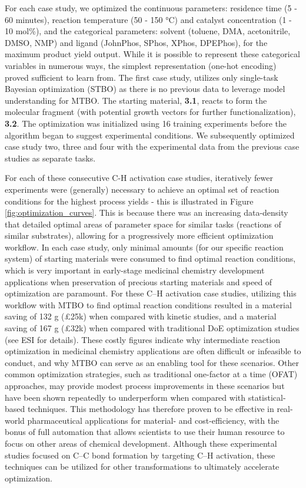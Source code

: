 For each case study, we optimized the continuous parameters: residence time (5 - 60 minutes), reaction temperature (50 - 150 °C) and catalyst concentration (1 - 10 mol\%), and the categorical parameters: solvent (toluene, DMA, acetonitrile, DMSO, NMP) and ligand (JohnPhos, SPhos, XPhos, DPEPhos), for the maximum product yield output. While it is possible to represent these categorical variables in numerous ways, the simplest representation (one-hot encoding) proved sufficient to learn from. The first case study, utilizes only single-task Bayesian optimization (STBO) as there is no previous data to leverage model understanding for MTBO. The starting material, \textbf{3.1}, reacts to form the molecular fragment (with potential growth vectors for further functionalization), \textbf{3.2}. The optimization was initialized using 16 training experiments before the algorithm began to suggest experimental conditions. We subsequently optimized case study two, three and four with the experimental data from the previous case studies as separate tasks.

For each of these consecutive C-H activation case studies, iteratively fewer experiments were (generally) necessary to achieve an optimal set of reaction conditions for the highest process yields - this is illustrated in Figure \ref{fig:optimization_curves}. This is because there was an increasing data-density that detailed optimal areas of parameter space for similar tasks (reactions of similar substrates), allowing for a progressively more efficient optimization workflow. In each case study, only minimal amounts (for our specific reaction system) of starting materials were consumed to find optimal reaction conditions, which is very important in early-stage medicinal chemistry development applications when preservation of precious starting materials and speed of optimization are paramount. For these C--H activation case studies, utilizing this workflow with MTBO to find optimal reaction conditions resulted in a material saving of 132 g (£25k) when compared with kinetic studies, and a material saving of 167 g (£32k) when compared with traditional DoE optimization studies (see ESI for details). These costly figures indicate why intermediate reaction optimization in medicinal chemistry applications are often difficult or infeasible to conduct, and why MTBO can serve as an enabling tool for these scenarios. Other common optimization strategies, such as traditional one-factor at a time (OFAT) approaches, may provide modest process improvements in these scenarios but have been shown repeatedly to underperform when compared with statistical-based techniques. This methodology has therefore proven to be effective in real-world pharmaceutical applications for material- and cost-efficiency, with the bonus of full automation that allows scientists to use their human resource to focus on other areas of chemical development. Although these experimental studies focused on C--C bond formation by targeting C--H activation, these techniques can be utilized for other transformations to ultimately accelerate optimization.


